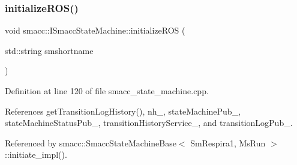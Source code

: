 \subsubsection{\texorpdfstring{initialize\+R\+O\+S()}{initializeROS()}}
{\footnotesize\ttfamily void smacc\+::\+I\+Smacc\+State\+Machine\+::initialize\+R\+OS (\begin{DoxyParamCaption}\item[{std\+::string}]{smshortname }\end{DoxyParamCaption})\hspace{0.3cm}{\ttfamily [protected]}}



Definition at line 120 of file smacc\+\_\+state\+\_\+machine.\+cpp.



References get\+Transition\+Log\+History(), nh\+\_\+, state\+Machine\+Pub\+\_\+, state\+Machine\+Status\+Pub\+\_\+, transition\+History\+Service\+\_\+, and transition\+Log\+Pub\+\_\+.



Referenced by smacc\+::\+Smacc\+State\+Machine\+Base$<$ Sm\+Respira1, Ms\+Run $>$\+::initiate\+\_\+impl().


